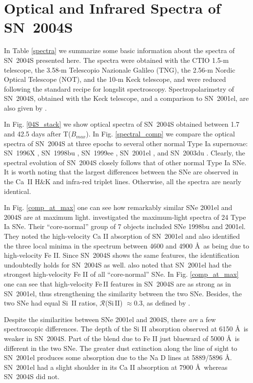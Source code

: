 \documentclass[12pt,preprint,psfig,epsf]{aastex}
\begin{document}
\section {Optical and Infrared Spectra of SN~2004S}


In Table \ref{spectra} we summarize some basic information about the
spectra of SN~2004S presented here. The spectra were obtained with the
CTIO 1.5-m telescope, the 3.58-m Telescopio Nazionale Galileo (TNG), the
2.56-m Nordic Optical Telescope (NOT), and the 10-m Keck telescope, and were
reduced following the standard recipe for longslit spectroscopy.
Spectropolarimetry of SN~2004S, obtained with the Keck telescope, and a
comparison to SN~2001el, are also given by \citet{Cho_etal06}.

In Fig. \ref{04S_stack} we show optical spectra of SN~2004S obtained
between 1.7 and 42.5 days after T($B_{max}$).
In Fig. \ref{spectral_comp} we compare the optical spectra of SN~2004S
at three epochs to several other normal Type Ia supernovae: SN~1996X \citep{Sal_etal01},
SN~1998bu \citep{Her_etal00}, SN~1999ee \citep{Ham_etal02}, SN~2001el 
\citep{Wan_etal03b}, and SN~2003du \citep{Gera_etal04, Sta_etal06}.
Clearly, the spectral evolution of SN~2004S closely follows that of
other normal Type Ia SNe. It is worth noting that the largest differences between
the SNe are observed in the Ca~II H\&K and infra-red triplet lines.
Otherwise, all the spectra are nearly identical.

In Fig. \ref{comp_at_max} one can see how remarkably similar SNe 2001el
and 2004S are at maximum light.
\citet{Bra_etal06} investigated the maximum-light spectra of 24 Type Ia
SNe. Their ``core-normal'' group of 7 objects included SNe 1998bu and
2001el.  They noted the high-velocity Ca II absorption of SN~2001el and
also identified the three local minima in the spectrum between 4600 and
4900 \AA\ as being due to high-velocity Fe II.
Since SN~2004S shows the
same features, the identification undoubtedly holds for SN~2004S as   
well.  \citet{Bra_etal06}  also noted
that SN~2001el had the strongest high-velocity Fe II of all
``core-normal'' SNe. In Fig. \ref{comp_at_max} one can see that
high-velocity Fe\,II features in SN~2004S are as strong as in SN~2001el, thus
strengthening the similarity between the two SNe. Besides, the two SNe had
equal Si~II ratios, $\mathcal{R}$(Si\,II) $\approx 0.3$, as defined by 
\citet{Nug_etal95}.

Despite the similarities between SNe 2001el and 2004S, there {\em are} 
a few spectroscopic differences. The depth of the Si II absorption
observed at 6150 \AA\ is weaker in SN~2004S. Part of the blend due to Fe
II just blueward of 5000 \AA\ is different in the two SNe.  The greater
dust extinction along the line of sight to SN~2001el produces some
absorption due to the Na D lines at 5889/5896 \AA.  SN~2001el had a
slight shoulder in its Ca II absorption at 7900 \AA\, whereas SN~2004S
did not.
\end{document}
